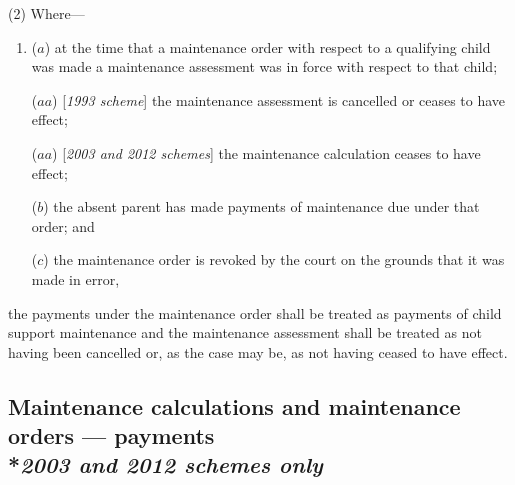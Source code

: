 \documentclass[12pt,a4paper]{article}
\begin{document}
(2) Where—
\begin{enumerate}\item[]
($a$) at the time that a maintenance order with respect to a qualifying child was made a maintenance assessment was in force with respect to that child;

($aa$) [\emph{1993 scheme}] the maintenance assessment is cancelled or ceases to have effect;

($aa$) [\emph{2003 and 2012 schemes}] the maintenance 
calculation
ceases to have effect;

($b$) the absent parent has made payments of maintenance due under that order; and

($c$) the maintenance order is revoked by the court on the grounds that it was made in error,
\end{enumerate}
the payments under the maintenance order shall be treated as payments of child support maintenance and the maintenance assessment shall be treated as not having been cancelled or, as the case may be,
as not having ceased to have effect. %


\subsection[8A. Maintenance calculations and maintenance orders --- payments]{\sloppy Maintenance calculations and maintenance orders --- payments\\*\emph{2003 and 2012 schemes only}}
\end{document}
